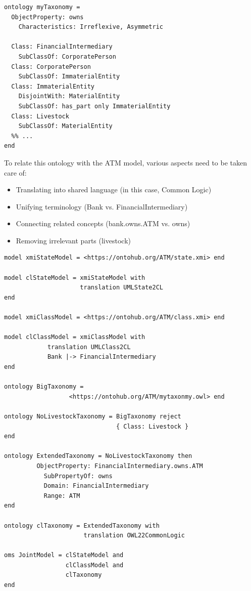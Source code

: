 \documentclass[10pt, a4paper]{isov2}
\begin{document}
\begin{lstlisting}[basicstyle=\ttfamily,language=dolText,alsolanguage=owl2Manchester,escapechar=@,mathescape]
ontology myTaxonomy =
  ObjectProperty: owns
    Characteristics: Irreflexive, Asymmetric

  Class: FinancialIntermediary
    SubClassOf: CorporatePerson
  Class: CorporatePerson
    SubClassOf: ImmaterialEntity
  Class: ImmaterialEntity
    DisjointWith: MaterialEntity
    SubClassOf: has_part only ImmaterialEntity
  Class: Livestock
    SubClassOf: MaterialEntity
  %% ...
end
\end{lstlisting}

 To relate this ontology with the ATM model,
various aspects need to be taken care of:
\begin{itemize}[noitemsep]
  \item Translating into shared language  (in this case, Common Logic)
  \item Unifying terminology (Bank vs. FinancialIntermediary)
  \item Connecting related concepts (bank.owns.ATM vs. owns)
  \item Removing irrelevant parts (livestock)
\end{itemize}

\begin{lstlisting}[basicstyle=\ttfamily\small,language=dolText,alsolanguage=owl2Manchester,escapechar=@,mathescape]
model xmiStateModel = <https://ontohub.org/ATM/state.xmi> end

model clStateModel = xmiStateModel with
                     translation UMLState2CL
end

model xmiClassModel = <https://ontohub.org/ATM/class.xmi> end

model clClassModel = xmiClassModel with
            translation UMLClass2CL
            Bank |-> FinancialIntermediary
end

ontology BigTaxonomy = 
                  <https://ontohub.org/ATM/mytaxonmy.owl> end

ontology NoLivestockTaxonomy = BigTaxonomy reject
                               { Class: Livestock }
end

ontology ExtendedTaxonomy = NoLivestockTaxonomy then
         ObjectProperty: FinancialIntermediary.owns.ATM
           SubPropertyOf: owns
           Domain: FinancialIntermediary
           Range: ATM
end

ontology clTaxonomy = ExtendedTaxonomy with
                      translation OWL22CommonLogic

oms JointModel = clStateModel and
                 clClassModel and
                 clTaxonomy
end
\end{lstlisting}
\end{document}

